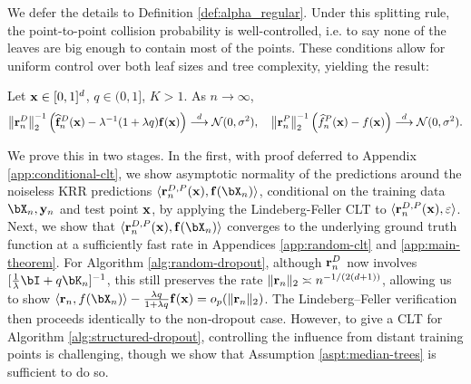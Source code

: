 \vspace{-1ex}
We defer the details to Definition \ref{def:alpha_regular}. Under this splitting rule, the point-to-point collision probability is well-controlled, i.e. to say none of the leaves are big enough to contain most of the points. 
These conditions allow for uniform control over both leaf sizes and tree complexity, yielding the result:
\begin{thm}
	\label{thm:main}
	Let $\mathbf{x} \in [0,1]^d$, $q \in (0,1]$, $K > 1$. As $n \to\infty$,
	$$
	\left\|\mathbf{r}^D_n\right\|_2^{-1}\left(\widehat{\mathbf{f}}^D_n(\mathbf{x}) - \lambda^{-1}(1+\lambda q)\mathbf{f}(\mathbf{x})\right) \stackrel{d}{\longrightarrow} \mathcal{N}(0,\sigma^2), \quad
	\left\|\mathbf{r}^P_n\right\|_2^{-1}\left(\widehat{f}^P_n(\mathbf{x}) - f(\mathbf{x})\right) \stackrel{d}{\longrightarrow} \mathcal{N}(0,\sigma^2).
	$$
\end{thm}
\vspace{-1ex}
We prove this in two stages. In the first, with proof deferred to Appendix \ref{app:conditional-clt}, we show asymptotic normality of the predictions around the noiseless KRR predictions $\langle \br_n^{D,P}(\bx), \f(\bX_n)\rangle$, conditional on the training data $\bX_n, \by_n$ and test point $\mathbf{x}$, by applying the Lindeberg-Feller CLT to \(\langle\mathbf{r}_n^{D,P}(\mathbf{x}), \varepsilon\rangle\). 
Next, we show that $\langle \br_n^{D,P}(\bx), \f(\bX_n)\rangle$ converges to the underlying ground truth function at a sufficiently fast rate in Appendices \ref{app:random-clt} and \ref{app:main-theorem}. For Algorithm \ref{alg:random-dropout}, although $\mathbf{r}_n^D$ now involves $[\frac1\lambda \bI+q\bK_n]^{-1}$, this still preserves the rate $\|\mathbf{r}_n\|_2\asymp n^{-1/(2(d+1))}$, allowing us to show $\langle \br_n,f(\bX_n)\rangle-\frac{\lambda q}{1+\lambda q} \f(\bx)=o_p(\|\br_n\|_2)$. The Lindeberg--Feller verification then proceeds identically to the non‑dropout case. However, to give a CLT for Algorithm \ref{alg:structured-dropout}, controlling the influence from distant training points is challenging, though we show that Assumption \ref{aspt:median-trees} is sufficient to do so. 

\vspace{-1ex}
